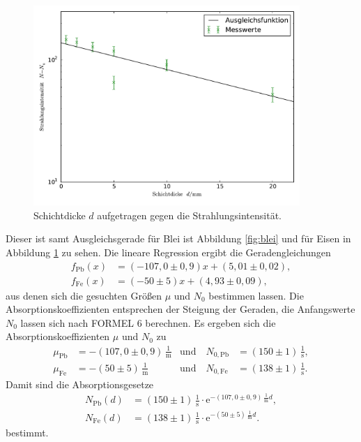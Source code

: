 \begin{figure}
	\centering
	\includegraphics[width=0.9\textwidth]{Bilder/Eisen.pdf}
	\caption{Schichtdicke $d$ aufgetragen gegen die Strahlungsintensität.}
	\label{fig:eisen}
\end{figure}
Dieser ist samt Ausgleichsgerade für Blei ist Abbildung \ref{fig:blei} und für Eisen in Abbildung \ref{fig:eisen} zu sehen.
Die lineare Regression ergibt die Geradengleichungen 
\begin{align}
f_\mathup{Pb}(x)&=(-107,0\pm0,9)x+(5,01\pm0,02),\\
f_\mathup{Fe}(x)&=(-50\pm5)x+(4,93\pm0,09),
\label{eq:lin_regress}
\end{align}
aus denen sich die gesuchten Größen $\mu$ und $N_0$ bestimmen lassen. 
Die Absorptionskoeffizienten entsprechen der Steigung der Geraden, die Anfangswerte $N_0$ lassen sich nach FORMEL 6 berechnen.
Es ergeben sich die Absorptionskoeffizienten $\mu$ und $N_0$ zu
\begin{align}
\mu_\mathup{Pb}&=-(107,0\pm0,9)\,\frac{1}{\si\meter} &\text{und}\quad  N_{0\mathup{,Pb}}&=(150\pm1)\,\frac{1}{\si\second},\\
\mu_\mathup{Fe}&=-(50\pm5)\,\frac{1}{\si\meter}  &\text{und}\quad  N_{0\mathup{,Fe}}&=(138\pm1)\,\frac{1}{\si\second}.
\end{align}
Damit sind die Absorptionsgesetze
\begin{align}
N_\mathup{Pb}(d)&=(150\pm1)\,\frac{1}{\si\second}\cdot\mathup{e}^{-(107,0\pm0,9)\,\frac{1}{\si\meter}d},\\
N_\mathup{Fe}(d)&=(138\pm1)\,\frac{1}{\si\second}\cdot\mathup{e}^{-(50\pm5)\,\frac{1}{\si\meter}d}.
\end{align}
bestimmt.

